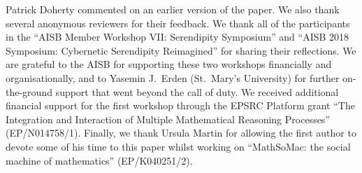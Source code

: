 \documentclass[natbib,a4paper,preprint,number,sort&compress,times]{elsarticle}
\begin{document}
Patrick Doherty commented on an earlier version of the paper.
We also thank several anonymous reviewers for their feedback.
We thank all of the participants in the ``AISB Member Workshop VII:
Serendipity Symposium'' and ``AISB 2018 Symposium: Cybernetic
Serendipity Reimagined'' for sharing their reflections.
We are grateful to the AISB for supporting these two workshops
financially and organisationally, and to Yasemin J.~Erden (St.~Mary's
University) for further on-the-ground support that went beyond the
call of duty.
We received additional financial support for the first workshop
through the EPSRC Platform grant ``The Integration and Interaction of
Multiple Mathematical Reasoning Processes'' (EP/N014758/1).
Finally, we thank Ursula Martin for allowing the first author to
devote some of his time to this paper whilst working on ``MathSoMac:
the social machine of mathematics'' (EP/K040251/2).






\DeclareRobustCommand{\VAN}[3]{#3}








\end{document}
